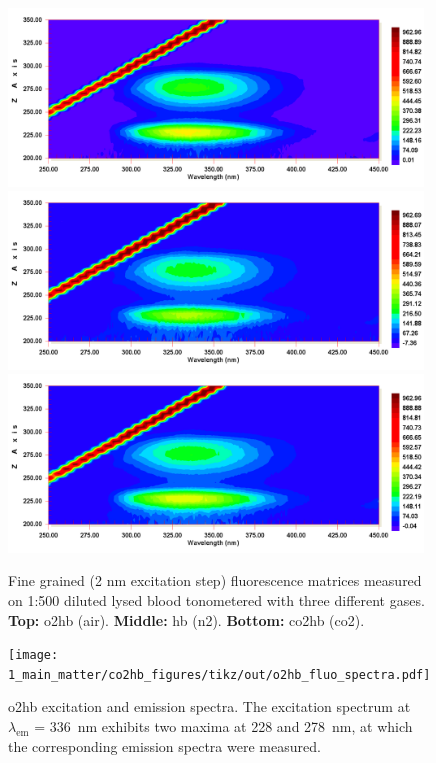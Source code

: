 \begin{figure}
	\centering
	\includegraphics[width=0.98\textwidth]{1_main_matter/co2hb_figures/fluorescence_matrices/fine/o2.png}
	\includegraphics[width=0.98\textwidth]{1_main_matter/co2hb_figures/fluorescence_matrices/fine/n2.png}
	\includegraphics[width=0.98\textwidth]{1_main_matter/co2hb_figures/fluorescence_matrices/fine/co2.png}
	\caption[Fine-grained haemoglobin fluorescence matrices.]{Fine grained (2 nm excitation step) fluorescence matrices measured on 1:500 diluted lysed blood tonometered with three different gases. \textbf{Top:} \gls{o2hb} (air). \textbf{Middle:} \gls{hb} (\gls{n2}). \textbf{Bottom:} \gls{co2hb} (\gls{co2}).}
	\label{fig:co2hb:fluo_matrix_fine}
\end{figure}

\begin{figure}
	\centering
	\texttt{[image: 1\_main\_matter/co2hb\_figures/tikz/out/o2hb\_fluo\_spectra.pdf]}
	\caption[\gls{o2hb} excitation and emission spectra.]{\gls{o2hb} excitation and emission spectra. The excitation spectrum at $\lambda_\text{em}$ = 336~nm exhibits two maxima at 228 and 278~nm, at which the corresponding emission spectra were measured.}
	\label{fig:co2hb:o2hb_fluo_spectra}
\end{figure}

